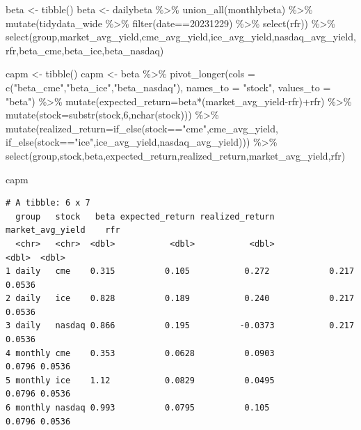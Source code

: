 \documentclass[
  a4paper,
  DIV=11,
  numbers=noendperiod]{scrreprt}
\newenvironment{Shaded}{\begin{snugshade}}{\end{snugshade}}
\newcommand{\AttributeTok}[1]{\textcolor[rgb]{0.40,0.45,0.13}{#1}}
\newcommand{\DecValTok}[1]{\textcolor[rgb]{0.68,0.00,0.00}{#1}}
\newcommand{\FunctionTok}[1]{\textcolor[rgb]{0.28,0.35,0.67}{#1}}
\newcommand{\NormalTok}[1]{\textcolor[rgb]{0.00,0.23,0.31}{#1}}
\newcommand{\OtherTok}[1]{\textcolor[rgb]{0.00,0.23,0.31}{#1}}
\newcommand{\SpecialCharTok}[1]{\textcolor[rgb]{0.37,0.37,0.37}{#1}}
\newcommand{\StringTok}[1]{\textcolor[rgb]{0.13,0.47,0.30}{#1}}
\begin{document}
\begin{Shaded}
\begin{Highlighting}[]
\NormalTok{beta }\OtherTok{\textless{}{-}} \FunctionTok{tibble}\NormalTok{()}
\NormalTok{beta }\OtherTok{\textless{}{-}}\NormalTok{ dailybeta }\SpecialCharTok{\%\textgreater{}\%} 
  \FunctionTok{union\_all}\NormalTok{(monthlybeta) }\SpecialCharTok{\%\textgreater{}\%} 
  \FunctionTok{mutate}\NormalTok{(tidydata\_wide }\SpecialCharTok{\%\textgreater{}\%} \FunctionTok{filter}\NormalTok{(date}\SpecialCharTok{==}\DecValTok{20231229}\NormalTok{) }\SpecialCharTok{\%\textgreater{}\%} \FunctionTok{select}\NormalTok{(rfr)) }\SpecialCharTok{\%\textgreater{}\%} 
  \FunctionTok{select}\NormalTok{(group,market\_avg\_yield,cme\_avg\_yield,ice\_avg\_yield,nasdaq\_avg\_yield,}
\NormalTok{         rfr,beta\_cme,beta\_ice,beta\_nasdaq)}

\NormalTok{capm }\OtherTok{\textless{}{-}} \FunctionTok{tibble}\NormalTok{()}
\NormalTok{capm }\OtherTok{\textless{}{-}}\NormalTok{ beta }\SpecialCharTok{\%\textgreater{}\%} 
  \FunctionTok{pivot\_longer}\NormalTok{(}\AttributeTok{cols =} \FunctionTok{c}\NormalTok{(}\StringTok{"beta\_cme"}\NormalTok{,}\StringTok{"beta\_ice"}\NormalTok{,}\StringTok{"beta\_nasdaq"}\NormalTok{),}
               \AttributeTok{names\_to =} \StringTok{"stock"}\NormalTok{, }\AttributeTok{values\_to =} \StringTok{"beta"}\NormalTok{) }\SpecialCharTok{\%\textgreater{}\%} 
  \FunctionTok{mutate}\NormalTok{(}\AttributeTok{expected\_return=}\NormalTok{beta}\SpecialCharTok{*}\NormalTok{(market\_avg\_yield}\SpecialCharTok{{-}}\NormalTok{rfr)}\SpecialCharTok{+}\NormalTok{rfr) }\SpecialCharTok{\%\textgreater{}\%} 
  \FunctionTok{mutate}\NormalTok{(}\AttributeTok{stock=}\FunctionTok{substr}\NormalTok{(stock,}\DecValTok{6}\NormalTok{,}\FunctionTok{nchar}\NormalTok{(stock))) }\SpecialCharTok{\%\textgreater{}\%} 
  \FunctionTok{mutate}\NormalTok{(}\AttributeTok{realized\_return=}\FunctionTok{if\_else}\NormalTok{(stock}\SpecialCharTok{==}\StringTok{"cme"}\NormalTok{,cme\_avg\_yield,}
                                \FunctionTok{if\_else}\NormalTok{(stock}\SpecialCharTok{==}\StringTok{"ice"}\NormalTok{,ice\_avg\_yield,nasdaq\_avg\_yield))) }\SpecialCharTok{\%\textgreater{}\%} 
  \FunctionTok{select}\NormalTok{(group,stock,beta,expected\_return,realized\_return,market\_avg\_yield,rfr)}

\NormalTok{capm}
\end{Highlighting}
\end{Shaded}

\begin{verbatim}
# A tibble: 6 x 7
  group   stock   beta expected_return realized_return market_avg_yield    rfr
  <chr>   <chr>  <dbl>           <dbl>           <dbl>            <dbl>  <dbl>
1 daily   cme    0.315          0.105           0.272            0.217  0.0536
2 daily   ice    0.828          0.189           0.240            0.217  0.0536
3 daily   nasdaq 0.866          0.195          -0.0373           0.217  0.0536
4 monthly cme    0.353          0.0628          0.0903           0.0796 0.0536
5 monthly ice    1.12           0.0829          0.0495           0.0796 0.0536
6 monthly nasdaq 0.993          0.0795          0.105            0.0796 0.0536
\end{verbatim}
\end{document}
